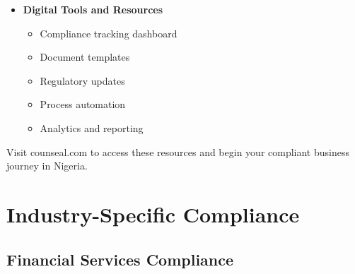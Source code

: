 \begin{tcolorbox}[
    colback=white,
    colframe=primarydark,
    title=\textbf{Counseal Support Framework},
    before skip=1em,
    after skip=1em
]
\begin{itemize}[leftmargin=*,itemsep=0.5em]
        \vspace{0.5em}

        \item \textbf{Digital Tools and Resources}
        \begin{itemize}[itemsep=0.3em]
            \item Compliance tracking dashboard
            \item Document templates
            \item Regulatory updates
            \item Process automation
            \item Analytics and reporting
        \end{itemize}
    \end{itemize}

    Visit counseal.com to access these resources and begin your compliant business journey in Nigeria.
\end{tcolorbox}

\vspace{2em}


\section{Industry-Specific Compliance}\label{sec:industry-compliance}
\vspace{1em}

\subsection{Financial Services Compliance}\label{subsec:financial-compliance}
\vspace{1em}


